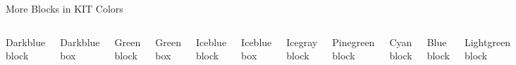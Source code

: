 \documentclass[
 UKenglish%
 ]{beamer}%
\begin{document}
\begin{frame}{More Blocks in KIT Colors}
  \begin{columns}
    \begin{darkblueblock}
      Darkblue block\strut
    \end{darkblueblock}
    \begin{darkbluebox}
      Darkblue box\strut
    \end{darkbluebox}
    \begin{greenblock}
      Green block\strut
    \end{greenblock}
    \begin{greenbox}
      Green box\strut
    \end{greenbox}
    \begin{iceblueblock}
      Iceblue block\strut
    \end{iceblueblock}
    \begin{icebluebox}
      Iceblue box\strut
    \end{icebluebox}
    \begin{icegrayblock}
      Icegray block\strut
    \end{icegrayblock}
    \begin{pinegreenblock}
      Pinegreen block\strut
    \end{pinegreenblock}
    \begin{cyanblock}
      Cyan block\strut
    \end{cyanblock}
    \begin{blueblock}
      Blue block\strut
    \end{blueblock}
    \begin{lightgreenblock}
      Lightgreen block\strut
    \end{lightgreenblock}
    \begin{forestgreenblock}
      Forestgreen block\strut
    \end{forestgreenblock}
    \begin{blackblock}
      Black block\strut
    \end{blackblock}
    \begin{blackbox}
      Black box\strut
    \end{blackbox}
    \begin{purpleblock}
      Purple block\strut
    \end{purpleblock}
    \begin{orangeblock}
      Orange block\strut
    \end{orangeblock}
    \begin{yellowblock}
      Yellow block\strut
    \end{yellowblock}
    \begin{redblock}
      Red block\strut
    \end{redblock}
    \begin{redbox}
      Red box\strut
    \end{redbox}
    \begin{brownblock}
      Brown block\strut
    \end{brownblock}
  \end{columns}
\end{frame}
\end{document}
